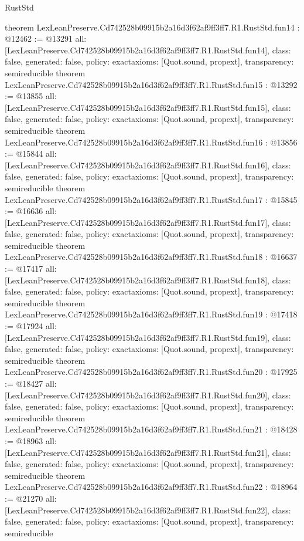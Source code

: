 \begin{lexlean}{RustStd}
\begin{coremodule}
{}
theorem LexLeanPreserve.Cd742528b09915b2a16d3f62af9ff3ff7.R1.RustStd.fun14 : @12462 := @13291 {
  all: [LexLeanPreserve.Cd742528b09915b2a16d3f62af9ff3ff7.R1.RustStd.fun14],
  class: false,
  generated: false,
  policy: exact{axioms: [Quot.sound, propext]},
  transparency: semireducible
}
theorem LexLeanPreserve.Cd742528b09915b2a16d3f62af9ff3ff7.R1.RustStd.fun15 : @13292 := @13855 {
  all: [LexLeanPreserve.Cd742528b09915b2a16d3f62af9ff3ff7.R1.RustStd.fun15],
  class: false,
  generated: false,
  policy: exact{axioms: [Quot.sound, propext]},
  transparency: semireducible
}
theorem LexLeanPreserve.Cd742528b09915b2a16d3f62af9ff3ff7.R1.RustStd.fun16 : @13856 := @15844 {
  all: [LexLeanPreserve.Cd742528b09915b2a16d3f62af9ff3ff7.R1.RustStd.fun16],
  class: false,
  generated: false,
  policy: exact{axioms: [Quot.sound, propext]},
  transparency: semireducible
}
theorem LexLeanPreserve.Cd742528b09915b2a16d3f62af9ff3ff7.R1.RustStd.fun17 : @15845 := @16636 {
  all: [LexLeanPreserve.Cd742528b09915b2a16d3f62af9ff3ff7.R1.RustStd.fun17],
  class: false,
  generated: false,
  policy: exact{axioms: [Quot.sound, propext]},
  transparency: semireducible
}
theorem LexLeanPreserve.Cd742528b09915b2a16d3f62af9ff3ff7.R1.RustStd.fun18 : @16637 := @17417 {
  all: [LexLeanPreserve.Cd742528b09915b2a16d3f62af9ff3ff7.R1.RustStd.fun18],
  class: false,
  generated: false,
  policy: exact{axioms: [Quot.sound, propext]},
  transparency: semireducible
}
theorem LexLeanPreserve.Cd742528b09915b2a16d3f62af9ff3ff7.R1.RustStd.fun19 : @17418 := @17924 {
  all: [LexLeanPreserve.Cd742528b09915b2a16d3f62af9ff3ff7.R1.RustStd.fun19],
  class: false,
  generated: false,
  policy: exact{axioms: [Quot.sound, propext]},
  transparency: semireducible
}
theorem LexLeanPreserve.Cd742528b09915b2a16d3f62af9ff3ff7.R1.RustStd.fun20 : @17925 := @18427 {
  all: [LexLeanPreserve.Cd742528b09915b2a16d3f62af9ff3ff7.R1.RustStd.fun20],
  class: false,
  generated: false,
  policy: exact{axioms: [Quot.sound, propext]},
  transparency: semireducible
}
theorem LexLeanPreserve.Cd742528b09915b2a16d3f62af9ff3ff7.R1.RustStd.fun21 : @18428 := @18963 {
  all: [LexLeanPreserve.Cd742528b09915b2a16d3f62af9ff3ff7.R1.RustStd.fun21],
  class: false,
  generated: false,
  policy: exact{axioms: [Quot.sound, propext]},
  transparency: semireducible
}
theorem LexLeanPreserve.Cd742528b09915b2a16d3f62af9ff3ff7.R1.RustStd.fun22 : @18964 := @21270 {
  all: [LexLeanPreserve.Cd742528b09915b2a16d3f62af9ff3ff7.R1.RustStd.fun22],
  class: false,
  generated: false,
  policy: exact{axioms: [Quot.sound, propext]},
  transparency: semireducible
}
\end{coremodule}
\end{lexlean}
